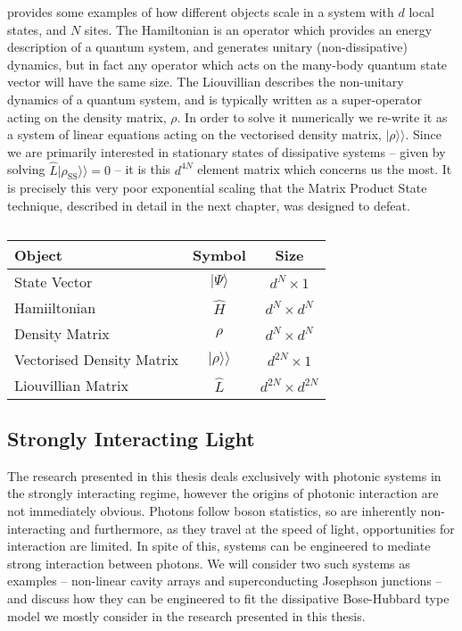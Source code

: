  provides some examples of how different objects scale in a system with \(d\) local states, and \(N\) sites. The Hamiltonian is an operator which provides an energy description of a quantum system, and generates unitary (non-dissipative) dynamics, but in fact any operator which acts on the many-body quantum state vector will have the same size. The Liouvillian describes the non-unitary dynamics of a quantum system, and is typically written as a super-operator acting on the density matrix, \(\rho\). In order to solve it numerically we re-write it as a system of linear equations acting on the vectorised density matrix, \(|\rho\rangle\rangle\). Since we are primarily interested in stationary states of dissipative systems -- given by solving \(\hat{L}|\rho_{\mathrm{SS}}\rangle\rangle = 0\) -- it is this \(d^{4N}\) element matrix which concerns us the most. It is precisely this very poor exponential scaling that the Matrix Product State technique, described in detail in the next chapter, was designed to defeat. 

\begin{table}[ht!]
	\centering
	\begin{tabu}{lcc}
		\hline
		Object & Symbol & Size \\
		\hline
		State Vector & \(|\Psi\rangle\) & \(d^{N} \times 1\) \\
		Hamiiltonian & \(\hat{H}\) & \(d^{N} \times d^{N}\) \\
		Density Matrix & \(\rho\) & \(d^{N} \times d^{N}\) \\
		Vectorised Density Matrix & \(|\rho \rangle\rangle\) & \(d^{2N} \times 1\) \\
		Liouvillian Matrix & \(\hat{L}\) & \(d^{2N} \times d^{2N}\)
	\end{tabu}
	\caption{\label{tab:mbq1-1}}
\end{table}

\subsection{Strongly Interacting Light}
The research presented in this thesis deals exclusively with photonic systems in the strongly interacting regime, however the origins of photonic interaction are not immediately obvious. Photons follow boson statistics, so are inherently non-interacting and furthermore, as they travel at the speed of light, opportunities for interaction are limited. In spite of this, systems can be engineered to mediate strong interaction between photons. We will consider two such systems as examples -- non-linear cavity arrays and superconducting Josephson junctions -- and discuss how they can be engineered to fit the dissipative Bose-Hubbard type model we mostly consider in the research presented in this thesis.

